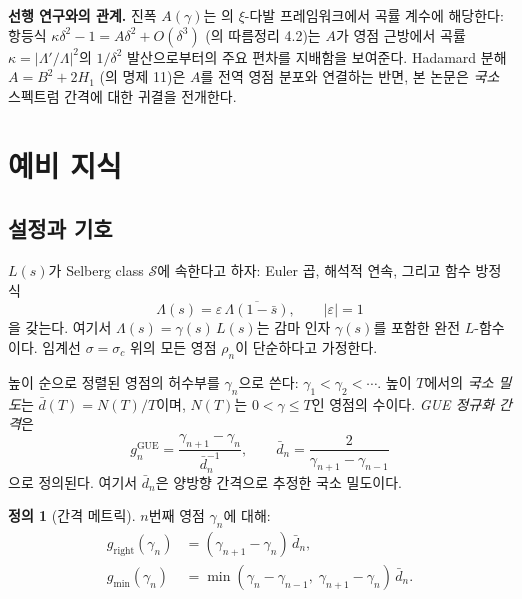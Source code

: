 \documentclass[11pt,a4paper]{article}
\theoremstyle{plain}
\theoremstyle{definition}
\newtheorem{definition}[theorem]{정의}
\newcommand{\La}{\Lambda}
\begin{document}
\medskip\noindent\textbf{선행 연구와의 관계.}
진폭 $A(\gamma)$는 \cite{paper1,paper2,paper3}의 $\xi$-다발 프레임워크에서
곡률 계수에 해당한다: 항등식
$\kappa \delta^2 - 1 = A\delta^2 + O(\delta^3)$ (\cite{paper2}의 따름정리 4.2)는
$A$가 영점 근방에서 곡률 $\kappa = |\La'/\La|^2$의 $1/\delta^2$ 발산으로부터의
주요 편차를 지배함을 보여준다.
Hadamard 분해 $A = B^2 + 2H_1$ (\cite{paper2}의 명제 11)은
$A$를 전역 영점 분포와 연결하는 반면,
본 논문은 \emph{국소} 스펙트럼 간격에 대한 귀결을 전개한다.


\section{예비 지식}
\label{sec:prelim}

\subsection{설정과 기호}

$L(s)$가 Selberg class $\mathcal{S}$에 속한다고 하자:
Euler 곱, 해석적 연속, 그리고 함수 방정식
\begin{equation}\label{eq:FE}
  \La(s) = \varepsilon\, \overline{\La(1 - \bar{s})},
  \qquad |\varepsilon| = 1
\end{equation}
을 갖는다. 여기서 $\La(s) = \gamma(s)\, L(s)$는 감마 인자 $\gamma(s)$를 포함한
완전 $L$-함수이다. 임계선 $\sigma = \sigma_c$ 위의 모든 영점 $\rho_n$이
단순하다고 가정한다.

높이 순으로 정렬된 영점의 허수부를 $\gamma_n$으로 쓴다:
$\gamma_1 < \gamma_2 < \cdots$.
높이 $T$에서의 \emph{국소 밀도}는 $\bar{d}(T) = N(T)/T$이며,
$N(T)$는 $0 < \gamma \le T$인 영점의 수이다.
\emph{GUE 정규화 간격}은
\begin{equation}\label{eq:gap_norm}
  g_n^{\mathrm{GUE}} = \frac{\gamma_{n+1} - \gamma_n}
  {\bar{d}_n^{-1}}, \qquad
  \bar{d}_n = \frac{2}{\gamma_{n+1} - \gamma_{n-1}}
\end{equation}
으로 정의된다. 여기서 $\bar{d}_n$은 양방향 간격으로 추정한 국소 밀도이다.

\begin{definition}[간격 메트릭]\label{def:gaps}
$n$번째 영점 $\gamma_n$에 대해:
\begin{align}
  g_{\mathrm{right}}(\gamma_n) &= (\gamma_{n+1} - \gamma_n)\,\bar{d}_n,
  \label{eq:gap_right}\\
  g_{\min}(\gamma_n) &= \min(\gamma_n - \gamma_{n-1},\;
  \gamma_{n+1} - \gamma_n)\,\bar{d}_n.
  \label{eq:gap_min}
\end{align}
\end{definition}
\end{document}
